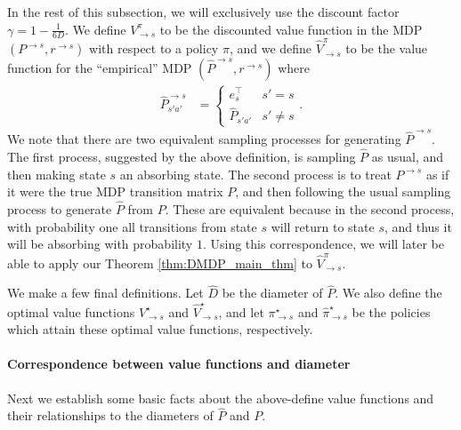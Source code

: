 \documentclass{article}
\theoremstyle{plain}
\theoremstyle{plain}
\theoremstyle{remark}
\theoremstyle{plain}
\theoremstyle{plain}
\newcommand{\Phat}{\widehat{P}}
\newcommand{\Vhat}{\widehat{V}}
\newcommand{\pistar}{\pi^\star}
\newcommand{\pihstar}{\widehat{\pi}^\star}
\begin{document}
    In the rest of this subsection, we will exclusively use the discount factor $\gamma = 1 - \frac{1}{6D}$. We define $V_{\to s}^\pi$ to be the discounted value function in the MDP $(P^{\to s}, r^{\to s})$ with respect to a policy $\pi$, and we define $\Vhat_{\to s}^\pi$ to be the value function for the ``empirical'' MDP $(\Phat^{\to s}, r^{\to s})$ where
    \begin{align*}
        \Phat^{\to s}_{s'a'} &= \begin{cases}
            e_{s}^\top & s' = s \\
            \Phat_{s'a'} &  s' \neq s
        \end{cases}.
    \end{align*}
    We note that there are two equivalent sampling processes for generating $\Phat^{\to s}$. The first process, suggested by the above definition, is sampling $\Phat$ as usual, and then making state $s$ an absorbing state. The second process is to treat $P^{\to s}$ as if it were the true MDP transition matrix $P$, and then following the usual sampling process to generate $\Phat$ from $P$. These are equivalent because in the second process, with probability one all transitions from state $s$ will return to state $s$, and thus it will be absorbing with probability $1$. Using this correspondence, we will later be able to apply our Theorem \ref{thm:DMDP_main_thm} to $\Vhat_{\to s}^\pi$. 

    We make a few final definitions. Let $\widehat{D}$ be the diameter of $\Phat$. We also define the optimal value functions $V^\star_{\to s}$ and $\Vhat^\star_{\to s}$, and let $\pistar_{\to s}$ and $\pihstar_{\to s}$ be the policies which attain these optimal value functions, respectively.
    
    \paragraph{Correspondence between value functions and diameter}
    Next we establish some basic facts about the above-define value functions and their relationships to the diameters of $\Phat$ and $P$.
\end{document}

